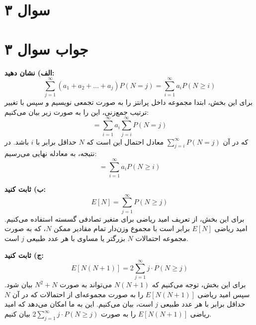 \section*{سوال ۳}



\section*{جواب سوال ۳}

\textbf{الف) نشان دهید:} 
\[ \sum_{j=1}^{\infty} (a_1 + a_2 + \ldots + a_j) P(N = j) = \sum_{i=1}^{\infty} a_i P(N \geq i) \]
برای این بخش، ابتدا مجموعه داخل پرانتز را به صورت تجمعی نویسیم و سپس با تغییر ترتیب جمع‌زنی، این را به صورت زیر بیان می‌کنیم:
\[ = \sum_{i=1}^{\infty} a_i \sum_{j=i}^{\infty} P(N = j) \]
که در آن \(\sum_{j=i}^{\infty} P(N = j)\) معادل احتمال این است که \(N\) حداقل برابر با \(i\) باشد. در نتیجه، به معادله نهایی می‌رسیم:
\[ = \sum_{i=1}^{\infty} a_i P(N \geq i) \]

\textbf{ب) ثابت کنید:} 
\[ E[N] = \sum_{j=1}^{\infty} P(N \geq j) \]
برای این بخش، از تعریف امید ریاضی برای متغیر تصادفی گسسته استفاده می‌کنیم. امید ریاضی \(E[N]\) برابر است با مجموع وزن‌دار تمام مقادیر ممکن \(N\)، که به صورت مجموعه احتمالات \(N\) بزرگتر یا مساوی با هر عدد طبیعی \(j\) است.

\textbf{ج) ثابت کنید:} 
\[ E[N(N + 1)] = 2 \sum_{j=1}^{\infty} j \cdot P(N \geq j) \]
برای این بخش، توجه می‌کنیم که \(N(N + 1)\) می‌تواند به صورت \(N^2 + N\) بیان شود. سپس امید ریاضی \(E[N(N + 1)]\) را به صورت مجموعه‌ای از احتمالات که در آن \(N\) حداقل برابر با هر عدد طبیعی \(j\) است، بیان می‌کنیم. این به ما امکان می‌دهد که امید ریاضی \(E[N(N + 1)]\) را به صورت \(2 \sum_{j=1}^{\infty} j \cdot P(N \geq j)\) بیان کنیم.
